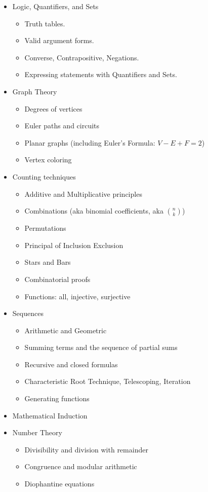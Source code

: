 \begin{itemize} 
 \item Logic, Quantifiers, and Sets
    \begin{itemize}
      \item Truth tables.
      \item Valid argument forms.
      \item Converse, Contrapositive, Negations.
      \item Expressing statements with Quantifiers and Sets.
    \end{itemize}
   
    \item Graph Theory
       \begin{itemize}
         \item Degrees of vertices
         \item Euler paths and circuits
         \item Planar graphs (including Euler's Formula: $V - E + F = 2$)
         \item Vertex coloring
       \end{itemize}
    
  \item Counting techniques
    \begin{itemize}
      \item Additive and Multiplicative principles
      \item Combinations (aka binomial coefficients, aka ${n\choose k}$)
      \item Permutations
      \item Principal of Inclusion Exclusion
      \item Stars and Bars
      \item Combinatorial proofs
      \item Functions: all, injective, surjective
    \end{itemize}

  \item Sequences
    \begin{itemize}
    \item Arithmetic and Geometric
    \item Summing terms and the sequence of partial sums
    \item Recursive and closed formulas
    \item Characteristic Root Technique, Telescoping, Iteration
    \item Generating functions
    \end{itemize}

\item Mathematical Induction

\item Number Theory
	\begin{itemize}
		\item Divisibility and division with remainder
		\item Congruence and modular arithmetic
		\item Diophantine equations
	\end{itemize}

 
\end{itemize}






